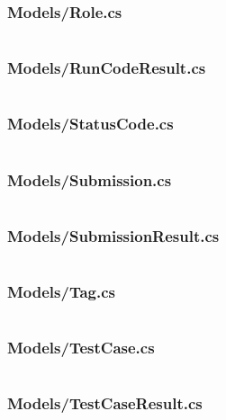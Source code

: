 \documentclass[a4paper]{report}
\begin{document}
\subsubsection{Models/Role.cs}

\inputminted{csharp}{"../src/Algorithm Dynamics.Core/Role.cs"}

\subsubsection{Models/RunCodeResult.cs}

\inputminted{csharp}{"../src/Algorithm Dynamics.Core/RunCodeResult.cs"}

\subsubsection{Models/StatusCode.cs}

\inputminted{csharp}{"../src/Algorithm Dynamics.Core/StatusCode.cs"}

\subsubsection{Models/Submission.cs}

\inputminted{csharp}{"../src/Algorithm Dynamics.Core/Submission.cs"}

\subsubsection{Models/SubmissionResult.cs}

\inputminted{csharp}{"../src/Algorithm Dynamics.Core/SubmissionResult.cs"}

\subsubsection{Models/Tag.cs}

\inputminted{csharp}{"../src/Algorithm Dynamics.Core/Tag.cs"}

\subsubsection{Models/TestCase.cs}

\inputminted{csharp}{"../src/Algorithm Dynamics.Core/TestCase.cs"}

\subsubsection{Models/TestCaseResult.cs}
\end{document}
